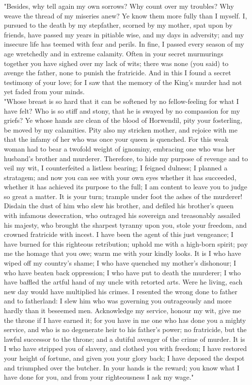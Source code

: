 \documentclass[10pt,a4paper]{report}
\begin{document}
"Besides, why tell again my own sorrows? Why count over my troubles? Why weave the thread of my miseries anew? Ye know them more fully than I myself. I, pursued to the death by my stepfather, scorned by my mother, spat upon by friends, have passed my years in pitiable wise, and my days in adversity; and my insecure life has teemed with fear and perils. In fine, I passed every season of my age wretchedly and in extreme calamity. Often in your secret murmurings together you have sighed over my lack of wits; there was none (you said) to avenge the father, none to punish the fratricide. And in this I found a secret testimony of your love; for I saw that the memory of the King's murder had not yet faded from your minds.\\

"Whose breast is so hard that it can be softened by no fellow-feeling for what I have felt? Who is so stiff and stony, that he is swayed by no compassion for my griefs? Ye whose hands are clean of the blood of Horwendil, pity your fosterling, be moved by my calamities. Pity also my stricken mother, and rejoice with me that the infamy of her who was once your queen is quenched. For this weak woman had to bear a twofold weight of ignominy, embracing one who was her husband's brother and murderer. Therefore, to hide my purpose of revenge and to veil my wit, I counterfeited a listless bearing; I feigned dulness; I planned a stratagem; and now you can see with your own eyes whether it has succeeded, whether it has achieved its purpose to the full; I am content to leave you to judge so great a matter. It is your turn; trample under foot the ashes of the murderer! Disdain the dust of him who slew his brother, and defiled his brother's queen with infamous desecration, who outraged his sovereign and treasonably assailed his majesty, who brought the sharpest tyranny upon you, stole your freedom, and crowned fratricide with incest. I have been the agent of this just vengeance; I have burned for this righteous retribution; uphold me with a high-born spirit; pay me the homage that you owe; warm me with your kindly looks. It is I who have wiped off my country's shame; I who have quenched my mother's dishonour; I who have beaten back oppression; I who have put to death the murderer; I who have baffled the artful hand of my uncle with retorted arts. Were he living, each new day would have multiplied his crimes. I resented the wrong done to father and to fatherland: I slew him who was governing you outrageously and more hardly than it beseemed men. Acknowledge my service, honour my wit, give me the throne if I have earned it; for you have in me one who has done you a mighty service, and who is no degenerate heir to his father's power; no fratricide, but the lawful successor to the throne; and a dutiful avenger of the crime of murder. It is I who have stripped you of slavery, and clothed you with freedom; I have restored your height of fortune, and given you your glory back; I have deposed the despot and triumphed over the butcher. In your hands is the reward; you know what I have done for you, and from your righteousness I ask my wage."\\
\end{document}
